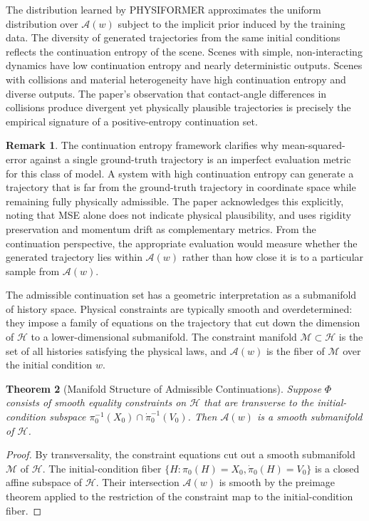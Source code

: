 \documentclass[12pt,oneside]{article}
\newtheorem{theorem}{Theorem}[section]
\theoremstyle{definition}
\newtheorem{remark}[theorem]{Remark}
\newcommand{\A}{\mathcal{A}}
\newcommand{\H}{\mathcal{H}}
\newcommand{\Mca}{\mathcal{M}}
\begin{document}
The distribution learned by PHYSIFORMER approximates the uniform distribution over
\(\A(w)\) subject to the implicit prior induced by the training data. The diversity of
generated trajectories from the same initial conditions reflects the continuation entropy
of the scene. Scenes with simple, non-interacting dynamics have low continuation entropy
and nearly deterministic outputs. Scenes with collisions and material heterogeneity have
high continuation entropy and diverse outputs. The paper's observation that contact-angle
differences in collisions produce divergent yet physically plausible trajectories is
precisely the empirical signature of a positive-entropy continuation set.

\begin{remark}
The continuation entropy framework clarifies why mean-squared-error against a single
ground-truth trajectory is an imperfect evaluation metric for this class of model. A
system with high continuation entropy can generate a trajectory that is far from the
ground-truth trajectory in coordinate space while remaining fully physically admissible.
The paper acknowledges this explicitly, noting that MSE alone does not indicate physical
plausibility, and uses rigidity preservation and momentum drift as complementary metrics.
From the continuation perspective, the appropriate evaluation would measure whether the
generated trajectory lies within \(\A(w)\) rather than how close it is to a particular
sample from \(\A(w)\).
\end{remark}

The admissible continuation set has a geometric interpretation as a submanifold of history
space. Physical constraints are typically smooth and overdetermined: they impose a family
of equations on the trajectory that cut down the dimension of \(\H\) to a lower-dimensional
submanifold. The constraint manifold \(\Mca \subset \H\) is the set of all histories
satisfying the physical laws, and \(\A(w)\) is the fiber of \(\Mca\) over the initial
condition \(w\).

\begin{theorem}[Manifold Structure of Admissible Continuations]
Suppose \(\Phi\) consists of smooth equality constraints on \(\H\) that are
transverse to the initial-condition subspace \(\pi_0^{-1}(X_0) \cap \dot{\pi}_0^{-1}(V_0)\).
Then \(\A(w)\) is a smooth submanifold of \(\H\).
\end{theorem}

\begin{proof}
By transversality, the constraint equations cut out a smooth submanifold \(\Mca\) of
\(\H\). The initial-condition fiber \(\{H : \pi_0(H) = X_0, \dot\pi_0(H) = V_0\}\) is
a closed affine subspace of \(\H\). Their intersection \(\A(w)\) is smooth by the
preimage theorem applied to the restriction of the constraint map to the initial-condition
fiber.
\end{proof}
\end{document}
